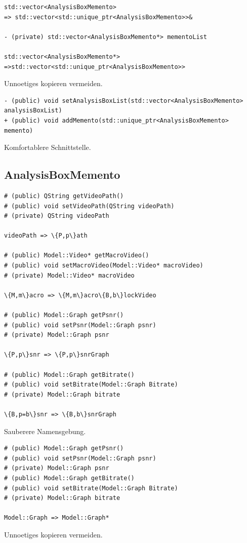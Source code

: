 \documentclass{scrartcl}
\begin{document}
{\begin{verbatim}
std::vector<AnalysisBoxMemento> 
=> std::vector<std::unique_ptr<AnalysisBoxMemento>>&

- (private) std::vector<AnalysisBoxMemento*> mementoList

std::vector<AnalysisBoxMemento*>
=>std::vector<std::unique_ptr<AnalysisBoxMemento>>
\end{verbatim}
Unnoetiges kopieren vermeiden.
\begin{verbatim}
- (public) void setAnalysisBoxList(std::vector<AnalysisBoxMemento> analysisBoxList)
+ (public) void addMemento(std::unique_ptr<AnalysisBoxMemento> memento)
\end{verbatim}
Komfortablere Schnittstelle.

\subsection{AnalysisBoxMemento}
\begin{verbatim}
# (public) QString getVideoPath()
# (public) void setVideoPath(QString videoPath)
# (private) QString videoPath

videoPath => \{P,p\}ath

# (public) Model::Video* getMacroVideo()
# (public) void setMacroVideo(Model::Video* macroVideo)
# (private) Model::Video* macroVideo

\{M,m\}acro => \{M,m\}acro\{B,b\}lockVideo

# (public) Model::Graph getPsnr()
# (public) void setPsnr(Model::Graph psnr)
# (private) Model::Graph psnr

\{P,p\}snr => \{P,p\}snrGraph

# (public) Model::Graph getBitrate()
# (public) void setBitrate(Model::Graph Bitrate)
# (private) Model::Graph bitrate

\{B,p=b\}snr => \{B,b\}snrGraph

\end{verbatim}
Sauberere Namensgebung.

\begin{verbatim}
# (public) Model::Graph getPsnr()
# (public) void setPsnr(Model::Graph psnr)
# (private) Model::Graph psnr
# (public) Model::Graph getBitrate()
# (public) void setBitrate(Model::Graph Bitrate)
# (private) Model::Graph bitrate

Model::Graph => Model::Graph*
\end{verbatim}
Unnoetiges kopieren vermeiden.

}
\end{document}

